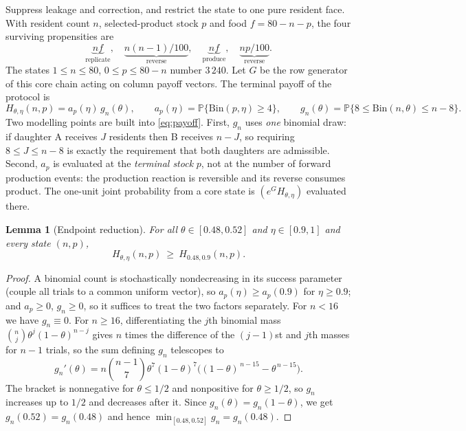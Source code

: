 \documentclass[11pt,a4paper]{article}
\theoremstyle{plain}
\newtheorem{lemma}[theorem]{Lemma}
\theoremstyle{definition}
\theoremstyle{remark}
\newcommand{\Prob}{\mathbb P}
\newcommand{\Bin}{\mathrm{Bin}}
\begin{document}
Suppress leakage and correction, and restrict the state to one pure resident face. With
resident count $n$, selected-product stock $p$ and food $f=80-n-p$, the four surviving
propensities are
\begin{equation}
\underbrace{nf}_{\text{replicate}},\quad \underbrace{n(n-1)/100}_{\text{reverse}},\quad
\underbrace{nf}_{\text{produce}},\quad \underbrace{np/100}_{\text{reverse}} .
\label{eq:core}
\end{equation}
The states $1\le n\le 80$, $0\le p\le 80-n$ number $3\,240$. Let $G$ be the row generator
of this core chain acting on column payoff vectors. The terminal payoff of the protocol
is
\begin{equation}
H_{\theta,\eta}(n,p)=a_p(\eta)\,g_n(\theta),\qquad
a_p(\eta)=\Prob\{\Bin(p,\eta)\ge4\},\qquad
g_n(\theta)=\Prob\{8\le\Bin(n,\theta)\le n-8\}.\label{eq:payoff}
\end{equation}
Two modelling points are built into \eqref{eq:payoff}. First, $g_n$ uses \emph{one}
binomial draw: if daughter A receives $J$ residents then B receives $n-J$, so requiring
$8\le J\le n-8$ is exactly the requirement that both daughters are admissible. Second,
$a_p$ is evaluated at the \emph{terminal stock} $p$, not at the number of forward
production events: the production reaction is reversible and its reverse consumes
product. The one-unit joint probability from a core state is $(e^{G}H_{\theta,\eta})$
evaluated there.

\begin{lemma}[Endpoint reduction]\label{lem:endpoint}
For all $\theta\in[0.48,0.52]$ and $\eta\in[0.9,1]$ and every state $(n,p)$,
\[
H_{\theta,\eta}(n,p)\ \ge\ H_{0.48,0.9}(n,p).
\]
\end{lemma}

\begin{proof}
A binomial count is stochastically nondecreasing in its success parameter (couple all
trials to a common uniform vector), so $a_p(\eta)\ge a_p(0.9)$ for $\eta\ge0.9$; and
$a_p\ge0$, $g_n\ge0$, so it suffices to treat the two factors separately. For $n<16$ we
have $g_n\equiv0$. For $n\ge16$, differentiating the $j$th binomial mass
$\binom nj\theta^j(1-\theta)^{n-j}$ gives $n$ times the difference of the $(j-1)$st and
$j$th masses for $n-1$ trials, so the sum defining $g_n$ telescopes to
\begin{equation}
g_n'(\theta)=n\binom{n-1}{7}\theta^{7}(1-\theta)^{7}
\bigl((1-\theta)^{\,n-15}-\theta^{\,n-15}\bigr).\label{eq:derivative}
\end{equation}
The bracket is nonnegative for $\theta\le1/2$ and nonpositive for $\theta\ge1/2$, so
$g_n$ increases up to $1/2$ and decreases after it. Since $g_n(\theta)=g_n(1-\theta)$, we
get $g_n(0.52)=g_n(0.48)$ and hence $\min_{[0.48,0.52]}g_n=g_n(0.48)$.
\end{proof}
\end{document}
